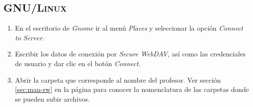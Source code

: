 {
 \linespread{1}
 \begin{table}[H]
 \caption{Formato de la \textsc{URL} de la secci\'{o}n de \textit{lectura y escritura}}{}
 \label{tab:rw-url-format}
 \noindent{} %
 \end{table}
}

      \subsection {\textsc{GNU/Linux}}
      \label{subsec:man-rw-gnulinux}

{
\linespread{0.1}
\begin{enumerate}

  \item En el escritorio de \textsl{Gnome} ir al men\'{u} \textsl{Places} y seleccionar la opci\'{o}n \textsl{Connect to Server}.


\newpage
  \item Escribir los datos de conexi\'{o}n por \textsl{Secure WebDAV}, as\'{i} como las credenciales de usuario y dar clic en el bot\'{o}n \textsl{Connect}.


  \item Abrir la carpeta que corresponde al nombre del profesor. Ver secci\'{o}n \ref{sec:man-rw} en la p\'{a}gina \pageref{sec:man-rw} para conocer la nomenclatura de las carpetas donde se pueden subir archivos.

\end{enumerate}
}

